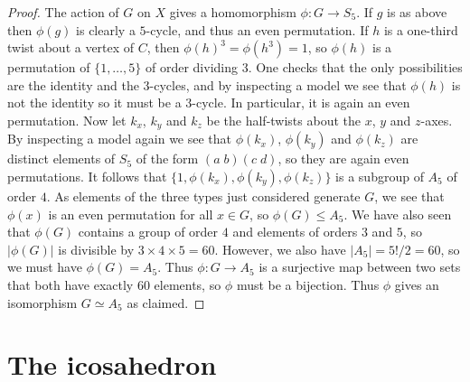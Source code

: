 \documentclass{amsart}
\newcommand{\xra}       {\xrightarrow}
\renewcommand{\:}{\colon}
\theoremstyle{definition}
\begin{document}
\begin{proof}
 The action of $G$ on $X$ gives a homomorphism $\phi\:G\xra{}S_5$.  If
 $g$ is as above then $\phi(g)$ is clearly a $5$-cycle, and thus an
 even permutation.  If $h$ is a one-third twist about a vertex of $C$,
 then $\phi(h)^3=\phi(h^3)=1$, so $\phi(h)$ is a permutation of
 $\{1,\ldots,5\}$ of order dividing $3$.  One checks that the only
 possibilities are the identity and the $3$-cycles, and by inspecting
 a model we see that $\phi(h)$ is not the identity so it must be a
 $3$-cycle.  In particular, it is again an even permutation.  Now let
 $k_x$, $k_y$ and $k_z$ be the half-twists about the $x$, $y$ and
 $z$-axes.  By inspecting a model again we see that $\phi(k_x)$,
 $\phi(k_y)$ and $\phi(k_z)$ are distinct elements of $S_5$ of the
 form $(a\;b)(c\;d)$, so they are again even permutations.  It
 follows that $\{1,\phi(k_x),\phi(k_y),\phi(k_z)\}$ is a subgroup of
 $A_5$ of order $4$.  As elements of the three types just considered
 generate $G$, we see that $\phi(x)$ is an even permutation for all
 $x\in G$, so $\phi(G)\leq A_5$.  We have also seen that $\phi(G)$
 contains a group of order $4$ and elements of orders $3$ and $5$, so
 $|\phi(G)|$ is divisible by $3\times 4\times 5=60$.  However, we also
 have $|A_5|=5!/2=60$, so we must have $\phi(G)=A_5$.  Thus
 $\phi\:G\xra{}A_5$ is a surjective map between two sets that both
 have exactly $60$ elements, so $\phi$ must be a bijection.  Thus
 $\phi$ gives an isomorphism $G\simeq A_5$ as claimed.
\end{proof}

\section{The icosahedron}
\end{document}
